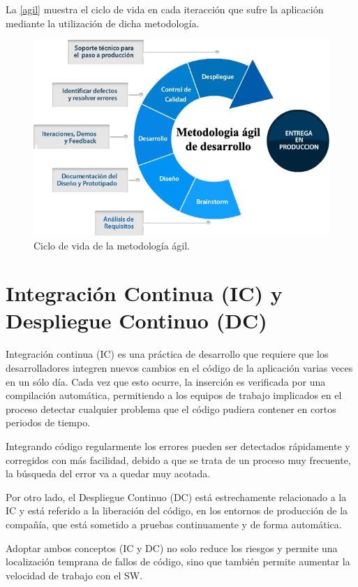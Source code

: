 La \autoref{agil} muestra el ciclo de vida en cada iteracción que sufre la aplicación mediante la utilización de dicha metodología.

\begin{figure}[htbp]
	\centering
	\includegraphics[width=1.0\linewidth]
	{tecnica/figuras/agil.png}
	\caption{Ciclo de vida de la metodología ágil.}
	\label{agil}
\end{figure}

\section{Integración Continua (\gls{IC}) y Despliegue Continuo (\gls{DC})}

Integración continua (\gls{IC}) es una práctica de desarrollo que requiere que los desarrolladores integren nuevos cambios en el código de la aplicación varias veces en un sólo día. Cada vez que esto ocurre, la inserción es verificada por una compilación automática, permitiendo a los equipos de trabajo implicados en el proceso detectar cualquier problema que el código pudiera contener en cortos periodos de tiempo.

Integrando código regularmente los errores pueden ser detectados rápidamente y corregidos con más facilidad, debido a que se trata de un proceso muy frecuente, la búsqueda del error va a quedar muy acotada.

Por otro lado, el Despliegue Continuo (\gls{DC}) está estrechamente relacionado a la \gls{IC} y está referido a la liberación del código, en los entornos de producción de la compañía, que está sometido a pruebas continuamente y de forma automática.

Adoptar ambos conceptos (\gls{IC} y \gls{DC}) no solo reduce los riesgos y permite una localización temprana de fallos de código, sino que también permite aumentar la velocidad de trabajo con el \gls{SW}\cite{IC2017}.

